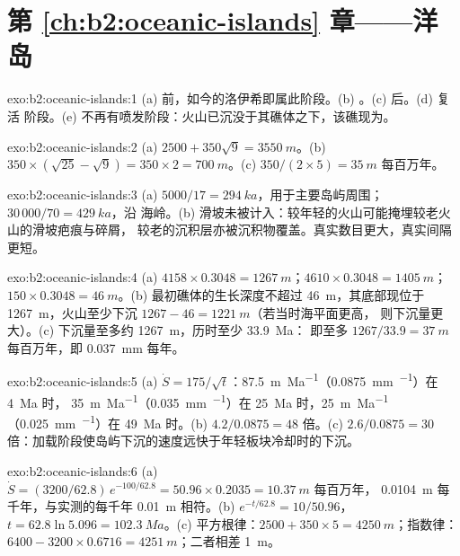 \section*{第 \ref{ch:b2:oceanic-islands} 章——洋岛}

\begin{solution}{exo:b2:oceanic-islands:1}
(a) 前，如今的洛伊希即属此阶段。(b) 。(c) 后。(d) 复活
阶段。(e) 不再有喷发阶段：火山已沉没于其礁体之下，该礁现为。
\end{solution}

\begin{solution}{exo:b2:oceanic-islands:2}
(a) $2500 + 350\sqrt9 = \qty{3550}{m}$。(b) $350\times(\sqrt{25} - \sqrt9) = 350\times2 =
\qty{700}{m}$。(c) $350/(2\times5) = \qty{35}{m}$ 每百万年。
\end{solution}

\begin{solution}{exo:b2:oceanic-islands:3}
(a) $5000/17 = \qty{294}{ka}$，用于主要岛屿周围；$30\,000/70 = \qty{429}{ka}$，沿
海岭。(b) 滑坡未被计入：较年轻的火山可能掩埋较老火山的滑坡疤痕与碎屑，
较老的沉积层亦被沉积物覆盖。真实数目更大，真实间隔
更短。
\end{solution}

\begin{solution}{exo:b2:oceanic-islands:4}
(a) $4158\times0.3048 = \qty{1267}{m}$；$4610\times0.3048 = \qty{1405}{m}$；$150\times0.3048 =
\qty{46}{m}$。(b) 最初礁体的生长深度不超过 \qty{46}{m}，其底部现位于
\qty{1267}{m}，火山至少下沉 $1267 - 46 = \qty{1221}{m}$（若当时海平面更高，
则下沉量更大）。(c) 下沉量至多约 \qty{1267}{m}，历时至少 \qty{33.9}{Ma}：
即至多 $1267/33.9 = \qty{37}{m}$ 每百万年，即 \qty{0.037}{mm} 每年。
\end{solution}

\begin{solution}{exo:b2:oceanic-islands:5}
(a) $\dot S = 175/\sqrt t$：\qty{87.5}{m.Ma^{-1}}（\qty{0.0875}{mm.^{-1}}）在 \qty{4}{Ma} 时，
\qty{35}{m.Ma^{-1}}（\qty{0.035}{mm.^{-1}}）在 \qty{25}{Ma} 时，\qty{25}{m.Ma^{-1}}
（\qty{0.025}{mm.^{-1}}）在 \qty{49}{Ma} 时。(b) $4.2/0.0875 = 48$ 倍。(c) $2.6/0.0875 = 30$
倍：加载阶段使岛屿下沉的速度远快于年轻板块冷却时的下沉。
\end{solution}

\begin{solution}{exo:b2:oceanic-islands:6}
(a) $\dot S = (3200/62.8)\,e^{-100/62.8} = 50.96\times0.2035 = \qty{10.37}{m}$ 每百万年，
\qty{0.0104}{m} 每千年，与实测的每千年 \qty{0.01}{m} 相符。(b) $e^{-t/62.8}
= 10/50.96$，$t = 62.8\ln5.096 = \qty{102.3}{Ma}$。(c) 平方根律：$2500 + 350\times5 =
\qty{4250}{m}$；指数律：$6400 - 3200\times0.6716 = \qty{4251}{m}$；二者相差
\qty{1}{m}。
\end{solution}

